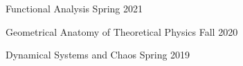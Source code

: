 \begin{multicols}{2}
\begin{cvcourseworks}
    \cvcoursework
      {Functional Analysis} %
      {} %
      {} %
      {Spring 2021} %
  
    \cvcoursework
      {Geometrical Anatomy of Theoretical Physics} %
      {} %
      {} %
      {Fall 2020} %
  
    \cvcoursework
      {Dynamical Systems and Chaos} %
      {} %
      {} %
      {Spring 2019} %


\end{cvcourseworks}


\end{multicols}

